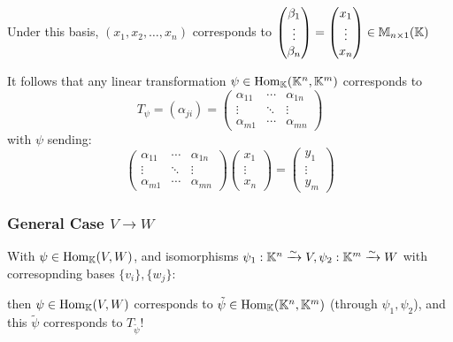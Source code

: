 Under this basis, \((x_1, x_2, \ldots, x_n)\) corresponds to \(\begin{pmatrix}
        \beta_1 \\ \vdots \\ \beta_n
    \end{pmatrix} = \begin{pmatrix}
        x_1 \\ \vdots \\ x_n
    \end{pmatrix} \in \mathbb{M}_{n \times 1}(\mathbb{K})\)

It follows that any linear transformation \(\psi \in \mathrm{Hom}_{\mathbb{K}}(\mathbb{K}^n, \mathbb{K}^m)\) corresponds to \[T_\psi = (\alpha_{ji}) = \begin{pmatrix}
            \alpha_{11} & \cdots & \alpha_{1n} \\
            \vdots      & \ddots & \vdots      \\
            \alpha_{m1} & \cdots & \alpha_{mn}
        \end{pmatrix}\]
with \(\psi\) sending: \[
    \begin{pmatrix}
            \alpha_{11} & \cdots & \alpha_{1n} \\
            \vdots      & \ddots & \vdots      \\
            \alpha_{m1} & \cdots & \alpha_{mn}
        \end{pmatrix}\begin{pmatrix}
            x_1 \\ \vdots \\ x_n
        \end{pmatrix} = \begin{pmatrix}
            y_1    \\
            \vdots \\
            y_m
        \end{pmatrix}
\]

\subsubsection{General Case \(V \to W\)}
With \(\psi \in \mathrm{Hom}_{\mathbb{K}}(V, W)\), and isomorphisms \(\psi_1: \mathbb{K}^n \xrightarrow{\sim} V, \psi_2: \mathbb{K}^m \xrightarrow{\sim} W\) with corresopnding bases \(\{v_i\}, \{w_j\}\):


then \(\psi \in \mathrm{Hom}_{\mathbb{K}}(V, W)\) corresponds to \(\tilde{\psi} \in \mathrm{Hom}_{\mathbb{K}}(\mathbb{K}^n, \mathbb{K}^m)\)  (through \(\psi_1, \psi_2\)), and this \(\tilde{\psi}\) corresponds to \(T_{\tilde{\psi}}\)!

